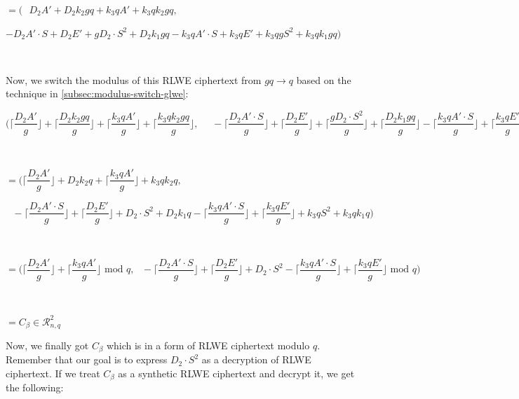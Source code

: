 $= (\text{ } D_2A' + D_2k_2gq + k_3qA' + k_3qk_2gq,$ 

\text{ } $ -D_2A'\cdot S + D_2E' + gD_2\cdot S^2 + D_2k_1gq
-k_3qA'\cdot S + k_3qE' + k_3qg S^2 + k_3qk_1gq)$



$ $

Now, we switch the modulus of this RLWE ciphertext from $gq \rightarrow q$ based on the technique in \autoref{subsec:modulus-switch-glwe}:




$ \Bigg(\Bigg\lceil\dfrac{D_2A'}{g}\Bigg\rfloor + \Bigg\lceil\dfrac{D_2k_2gq}{g}\Bigg\rfloor + \Bigg\lceil\dfrac{k_3qA'}{g}\Bigg\rfloor + \Bigg\lceil\dfrac{k_3qk_2gq}{g}\Bigg\rfloor, \text{ } \text{ }-\Bigg\lceil\dfrac{D_2A'\cdot S}{g}\Bigg\rfloor + \Bigg\lceil\dfrac{D_2E'}{g}\Bigg\rfloor + \Bigg\lceil\dfrac{gD_2\cdot S^2}{g}\Bigg\rfloor + \Bigg\lceil\dfrac{D_2k_1gq}{g}\Bigg\rfloor
-\Bigg\lceil\dfrac{k_3qA'\cdot S}{g}\Bigg\rfloor + \Bigg\lceil\dfrac{k_3qE'}{g}\Bigg\rfloor + \Bigg\lceil\dfrac{k_3qg S^2}{g}\Bigg\rfloor + \Bigg\lceil\dfrac{k_3qk_1gq}{g}\Bigg\rfloor\Bigg)$

$ $


$=\Bigg(\Bigg\lceil\dfrac{D_2A'}{g}\Bigg\rfloor + D_2k_2q +\Bigg\lceil\dfrac{k_3qA'}{g}\Bigg\rfloor + k_3qk_2q,$

$  \text{ } -\Bigg\lceil\dfrac{D_2A'\cdot S}{g}\Bigg\rfloor + \Bigg\lceil\dfrac{D_2E'}{g}\Bigg\rfloor + D_2\cdot S^2 + D_2k_1q
-\Bigg\lceil\dfrac{k_3qA'\cdot S}{g}\Bigg\rfloor + \Bigg\lceil\dfrac{k_3qE'}{g}\Bigg\rfloor + k_3q S^2 + k_3qk_1q\Bigg)$

$ $

$= \Bigg(\Bigg\lceil\dfrac{D_2A'}{g}\Bigg\rfloor +\Bigg\lceil\dfrac{k_3qA'}{g}\Bigg\rfloor \text{ mod } q,  \text{ } -\Bigg\lceil\dfrac{D_2A'\cdot S}{g}\Bigg\rfloor + \Bigg\lceil\dfrac{D_2E'}{g}\Bigg\rfloor + D_2\cdot S^2
-\Bigg\lceil\dfrac{k_3qA'\cdot S}{g}\Bigg\rfloor + \Bigg\lceil\dfrac{k_3qE'}{g}\Bigg\rfloor \text{ mod } q\Bigg)$

$ $

$= C_\beta \in \mathcal{R}_{n, q}^2$

Now, we finally got $C_\beta$ which is in a form of RLWE ciphertext modulo $q$. Remember that our goal is to express $D_2\cdot S^2$ as a decryption of RLWE ciphertext. If we treat $C_\beta$ as a synthetic RLWE ciphertext and decrypt it, we get the following:

